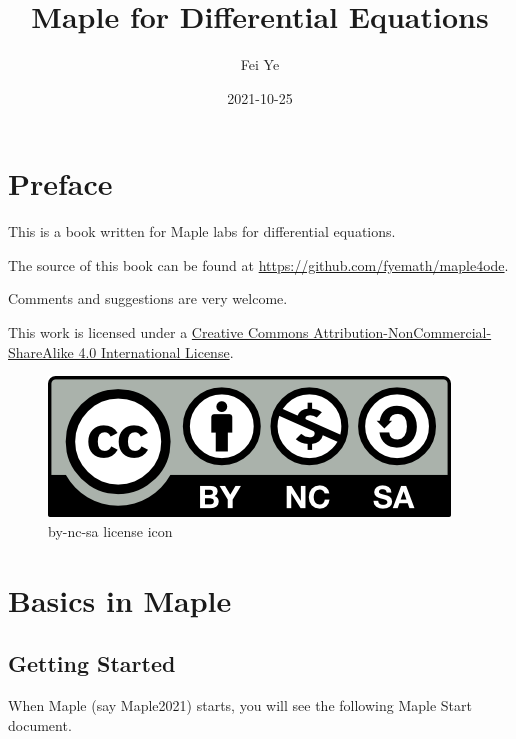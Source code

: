 \documentclass[
  12pt]{elegantbook}
\institute{QCC-CUNY}
\title{Maple for Differential Equations}
\author{Fei Ye}
\date{2021-10-25}
\begin{document}
\maketitle

{
\setcounter{tocdepth}{0}
\tableofcontents
}
\mainmatter

\hypersetup{pageanchor=true}

\captionsetup[figure]{labelformat=empty}
\captionsetup[subfigure]{labelformat=empty}

\hypertarget{preface}{%
\chapter*{Preface}\label{preface}}

This is a book written for Maple labs for differential equations.

The source of this book can be found at \url{https://github.com/fyemath/maple4ode}.

Comments and suggestions are very welcome.

This work is licensed under a \href{https://creativecommons.org/licenses/by-nc-sa/4.0/}{Creative Commons Attribution-NonCommercial-ShareAlike 4.0 International License}.

\begin{figure}
\centering
\includegraphics{figs/by-nc-sa.png}
\caption{by-nc-sa license icon}
\end{figure}

\hypertarget{basics-in-maple}{%
\chapter{Basics in Maple}\label{basics-in-maple}}

\hypertarget{getting-started}{%
\section{Getting Started}\label{getting-started}}

When Maple (say Maple2021) starts, you will see the following Maple Start document.
\end{document}
